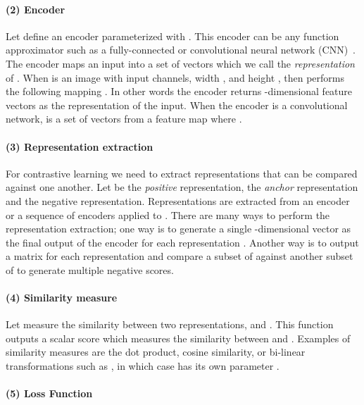 \documentclass{article}
\begin{document}
\paragraph{(2) Encoder}

Let  define an encoder parameterized with . This encoder can be any function approximator such as a fully-connected or convolutional neural network (CNN)~\cite{lecun2004learning,lecun1990handwritten,krizhevsky2012ImageNet}.
The encoder maps an input  into a set of vectors  which we call the \textit{representation} of . When  is an image with  input channels, width , and height , then  performs the following mapping . In other words the encoder returns  -dimensional feature vectors as the representation of the input. When the encoder is a convolutional network,  is a set of vectors from a feature map  where .

\paragraph{(3) Representation extraction}

For contrastive learning we need to extract representations that can be compared against one another. Let  be the \textit{positive} representation,  the \textit{anchor} representation and  the negative representation. Representations are extracted from an encoder or a sequence of encoders applied to . There are many ways to perform the representation extraction; one way is to generate a single -dimensional vector as the final output of the encoder for each representation . Another way is to output a matrix for each representation  and compare a subset of  against another subset of  to generate multiple negative scores.

\paragraph{(4) Similarity measure} 

Let  measure the similarity between two representations,  and . This function outputs a scalar score  which measures the similarity between  and . Examples of similarity measures are the dot product, cosine similarity, or bi-linear transformations such as , in which case  has its own parameter .

\paragraph{(5) Loss Function}  
\end{document}
